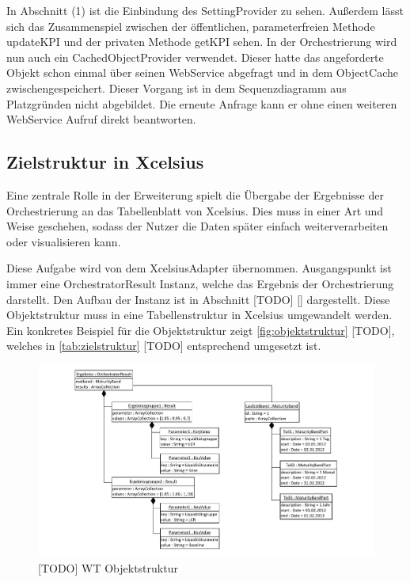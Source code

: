 In Abschnitt (1) ist die Einbindung des SettingProvider zu sehen. Außerdem lässt sich das Zusammenspiel zwischen der öffentlichen, parameterfreien Methode updateKPI und der privaten Methode getKPI sehen. In der Orchestrierung wird nun auch ein CachedObjectProvider verwendet. Dieser hatte das angeforderte Objekt schon einmal über seinen WebService abgefragt und in dem ObjectCache zwischengespeichert. Dieser Vorgang ist in dem Sequenzdiagramm aus Platzgründen nicht abgebildet. Die erneute Anfrage kann er ohne einen weiteren WebService Aufruf direkt beantworten.

\subsection{Zielstruktur in Xcelsius}
Eine zentrale Rolle in der Erweiterung spielt die Übergabe der Ergebnisse der Orchestrierung an das Tabellenblatt von Xcelsius. Dies muss in einer Art und Weise geschehen, sodass der Nutzer die Daten später einfach weiterverarbeiten oder visualisieren kann.

Diese Aufgabe wird von dem XcelsiusAdapter übernommen. Ausgangspunkt ist immer eine OrchestratorResult Instanz, welche das Ergebnis der Orchestrierung darstellt. Den Aufbau der Instanz ist in Abschnitt [TODO] \vref{} dargestellt. Diese Objektstruktur muss in eine Tabellenstruktur in Xcelsius umgewandelt werden. Ein konkretes Beispiel für die Objektstruktur zeigt \vref{fig:objektstruktur} [TODO], welches in \vref{tab:zielstruktur} [TODO] entsprechend umgesetzt ist.

\begin{figure}[h]
\centering
\setlength{\unitlength}{1mm}
\includegraphics[width=15cm]{Visio/Entwurf-Objektstruktur.pdf}
\caption{[TODO] WT Objektstruktur\label{fig:objektstruktur}}
\end{figure}


